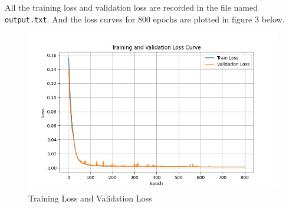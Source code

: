 \documentclass{article}
\begin{document}
All the training loss and validation loss are recorded in the file named \texttt{output.txt}.
And the loss curves for 800 epochs are plotted in figure 3 below.
\begin{figure}[ht]
  \centering
  \includegraphics[width=\linewidth]{../assets/Training Loss and Validation Loss.png}
  \caption{Training Loss and Validation Loss}
\end{figure}
\end{document}
